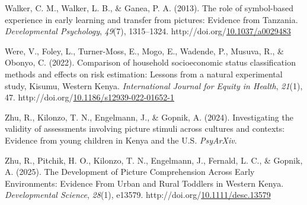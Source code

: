 \documentclass[10pt, letterpaper]{article}
\begin{document}
\begin{CSLReferences}{1}{0}
Walker, C. M., Walker, L. B., \& Ganea, P. A. (2013). The role of
symbol-based experience in early learning and transfer from pictures:
{Evidence} from {Tanzania}. \emph{Developmental Psychology},
\emph{49}(7), 1315--1324.
http://doi.org/\href{https://doi.org/10.1037/a0029483}{10.1037/a0029483}

Were, V., Foley, L., Turner-Moss, E., Mogo, E., Wadende, P., Musuva, R.,
\& Obonyo, C. (2022). Comparison of household socioeconomic status
classification methods and effects on risk estimation: Lessons from a
natural experimental study, {Kisumu}, {Western} {Kenya}.
\emph{International Journal for Equity in Health}, \emph{21}(1), 47.
http://doi.org/\href{https://doi.org/10.1186/s12939-022-01652-1}{10.1186/s12939-022-01652-1}

Zhu, R., Kilonzo, T. N., Engelmann, J., \& Gopnik, A. (2024).
Investigating the validity of assessments involving picture stimuli
across cultures and contexts: {Evidence} from young children in {Kenya}
and the {U}.{S}. \emph{PsyArXiv}.

Zhu, R., Pitchik, H. O., Kilonzo, T. N., Engelmann, J., Fernald, L. C.,
\& Gopnik, A. (2025). The {Development} of {Picture} {Comprehension}
{Across} {Early} {Environments}: {Evidence} {From} {Urban} and {Rural}
{Toddlers} in {Western} {Kenya}. \emph{Developmental Science},
\emph{28}(1), e13579.
http://doi.org/\href{https://doi.org/10.1111/desc.13579}{10.1111/desc.13579}

\end{CSLReferences}


\end{document}
